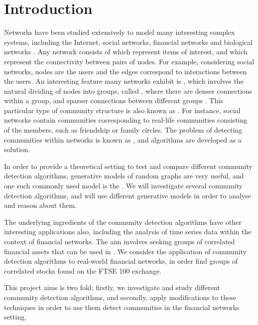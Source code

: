 
\chapter{Introduction}

\label{cha:introduction}


Networks have been studied extensively to model many interesting complex systems, including the Internet, social networks, financial networks and biological networks \cite{New06a,DKM+13,MG13}.
Any network consists of  which represent items of interest, and  which represent the connectivity between pairs of nodes. For example, considering social networks, nodes are the users and the edges correspond to interactions between the users.
An interesting feature many networks exhibit is , which involves the natural dividing of nodes into groups, called , where there are denser connections within a group, and sparser connections between different groups \cite{New06a,DKM+13,For10,New06b}. This particular type of community structure is also known as  \cite{DKM+13}. For instance, social networks contain communities corresponding to real-life communities consisting of the members, such as friendship or family circles.
The problem of detecting communities within networks is known as , and algorithms are developed as a solution.

In order to provide a theoretical setting to test and compare different community detection algorithms, generative models of random graphs are very useful, and one such commonly used model is the  \cite{DKM+13,NN12}. We will investigate several community detection algorithms, and will use different generative models in order to analyse and reason about them.

The underlying ingredients of the community detection algorithms have other interesting applications also, including the analysis of time series data within the context of financial networks. The aim involves seeking groups of correlated financial assets that can be used in .
We consider the application of community detection algorithms to real-world financial networks, in order find groups of correlated stocks found on the FTSE 100 exchange.

This project aims is two fold; firstly, we investigate and study different community detection algorithms, and secondly, apply modifications to these techniques in order to use them detect communities in the financial networks setting.
